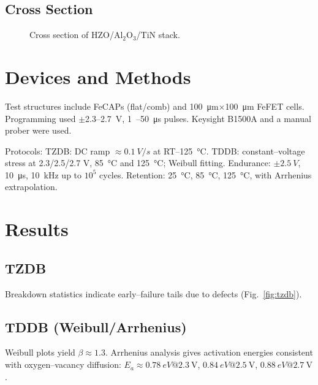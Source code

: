 \documentclass[conference]{IEEEtran}
\begin{document}
\subsection{Cross Section}
\begin{figure}[t]
\centering
{}
\caption{Cross section of HZO/Al\(_2\)O\(_3\)/TiN stack.}
\label{fig:cross_section}
\end{figure}

\section{Devices and Methods}
Test structures include FeCAPs (flat/comb) and \SI{100}{\micro m}\(\times\)\SI{100}{\micro m} FeFET cells. 
Programming used \(\pm\)2.3–\SI{2.7}{V}, \SI{1}{–}\SI{50}{\micro s} pulses. 
Keysight B1500A and a manual prober were used.  

Protocols:  
TZDB: DC ramp \(\approx \SI{0.1}{V/s}\) at RT–\SI{125}{\celsius}.  
TDDB: constant–voltage stress at 2.3/2.5/2.7 V, \SI{85}{\celsius} and \SI{125}{\celsius}; Weibull fitting.  
Endurance: \(\pm\SI{2.5}{V}\), \SI{10}{\micro s}, \SI{10}{kHz} up to \(10^{5}\) cycles.  
Retention: \SI{25}{\celsius}, \SI{85}{\celsius}, \SI{125}{\celsius}, with Arrhenius extrapolation.

\section{Results}
\subsection{TZDB}
Breakdown statistics indicate early–failure tails due to defects (Fig.~\ref{fig:tzdb}).

\subsection{TDDB (Weibull/Arrhenius)}
Weibull plots yield \(\beta \approx 1.3\).  
Arrhenius analysis gives activation energies consistent with oxygen–vacancy diffusion:
\(E_a \approx \SI{0.78}{eV} @ 2.3~\mathrm{V}\),
\(\SI{0.84}{eV} @ 2.5~\mathrm{V}\),
\(\SI{0.88}{eV} @ 2.7~\mathrm{V}\).
\end{document}
